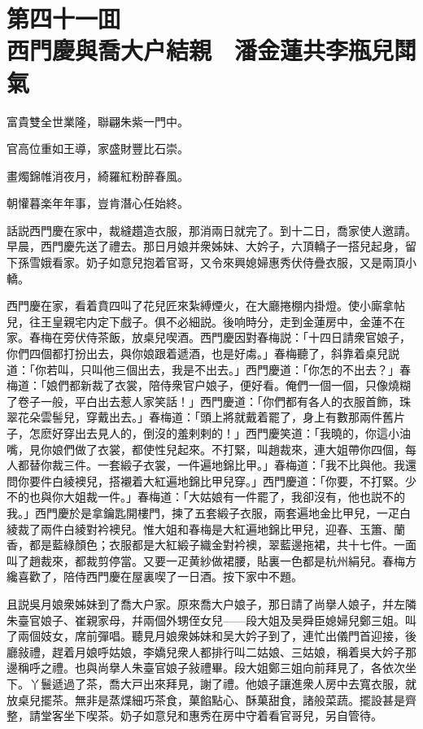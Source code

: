 
\chapter*{第四十一囬　\\西門慶與喬大户結親　潘金蓮共李瓶兒鬦氣}


\begin{myquote}
富貴雙全世業隆，聯翩朱紫一門中。

官高位重如王導，家盛財豐比石崇。

畫燭錦帷消夜月，綺羅紅粉醉春風。

朝懽暮楽年年事，豈肯潛心任始終。
\end{myquote}

話説西門慶在家中，裁縫趲造衣服，那消兩日就完了。到十二日，喬家使人邀請。早晨，西門慶先送了禮去。那日月娘并衆姊妹、大妗子，六頂轎子一搭兒起身，留下孫雪娥看家。奶子如意兒抱着官哥，又令來興媳婦惠秀伏侍疊衣服，又是兩頂小轎。

西門慶在家，看着賁四叫了花兒匠來紮縛煙火，在大廳捲棚内掛燈。使小廝拿帖兒，往王皇親宅内定下戲子。俱不必細説。後响時分，走到金蓮房中，金蓮不在家。春梅在旁伏侍茶飯，放桌兒喫酒。西門慶因對春梅説：「十四日請衆官娘子，你們四個都打扮出去，與你娘跟着遞酒，也是好䖏。」春梅聽了，斜靠着桌兒説道：「你若叫，只叫他三個出去，我是不出去。」西門慶道：「你怎的不出去？」春梅道：「娘們都新裁了衣裳，陪侍衆官户娘子，便好看。俺們一個一個，只像燒糊了卷子一般，平白出去惹人家笑話！」西門慶道：「你們都有各人的衣服首飾，珠翠花朵雲髻兒，穿戴出去。」春梅道：「頭上將就戴着罷了，身上有數那兩件舊片子，怎麽好穿出去見人的，倒沒的羞剌剌的！」西門慶笑道：「我曉的，你這小油嘴，見你娘們做了衣裳，都使性兒起來。不打緊，叫趙裁來，連大姐帶你四個，每人都替你裁三件。一套緞子衣裳，一件遍地錦比甲。」春梅道：「我不比與他。我還問你要件白綾襖兒，搭襯着大紅遍地錦比甲兒穿。」西門慶道：「你要，不打緊。少不的也與你大姐裁一件。」春梅道：「大姑娘有一件罷了，我卻沒有，他也説不的我。」西門慶於是拿鑰匙開樓門，揀了五套緞子衣服，兩套遍地金比甲兒，一疋白綾裁了兩件白綾對衿襖兒。惟大姐和春梅是大紅遍地錦比甲兒，迎春、玉簫、蘭香，都是藍綠顏色；衣服都是大紅緞子織金對衿襖，翠藍邊拖裙，共十七件。一面叫了趙裁來，都裁剪停當。又要一疋黄紗做裙腰，貼裏一色都是杭州絹兒。春梅方纔喜歡了，陪侍西門慶在屋裏喫了一日酒。按下家中不題。

且説吳月娘衆姊妹到了喬大户家。原來喬大户娘子，那日請了尚擧人娘子，幷左隣朱臺官娘子、崔親家母，幷兩個外甥侄女兒——段大姐及吴舜臣媳婦兒鄭三姐。叫了兩個妓女，席前彈唱。聽見月娘衆姊妹和吴大妗子到了，連忙出儀門首迎接，後廳敍禮，趕着月娘呼姑娘，李嬌兒衆人都排行叫二姑娘、三姑娘，稱着吳大妗子那邊稱呼之禮。也與尚擧人朱臺官娘子敍禮畢。段大姐鄭三姐向前拜見了，各依次坐下。丫鬟遞過了茶，喬大戸出來拜見，謝了禮。他娘子讓進衆人房中去寬衣服，就放桌兒擺茶。無非是蒸煠細巧茶食，菓餡點心、酥菓甜食，諸般菜蔬。擺設甚是齊整，請堂客坐下喫茶。奶子如意兒和惠秀在房中守着看官哥兒，另自管待。

